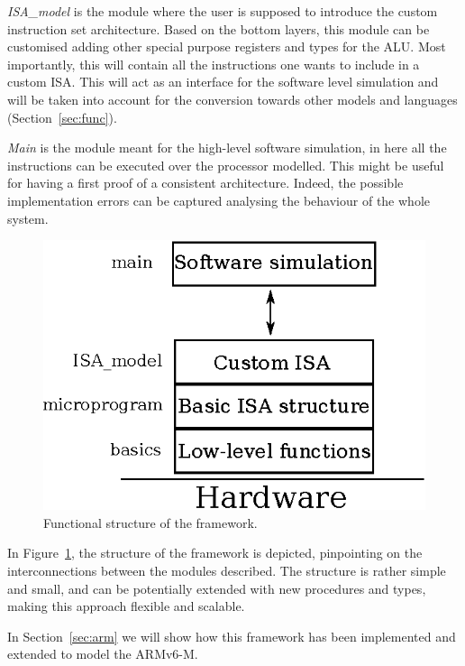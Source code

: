 \documentclass[conference]{IEEEtran}
\begin{document}
\textit{ISA\_model} is the module where the user is supposed to introduce the custom 
instruction set architecture. Based on the bottom layers, this
module can be customised adding other special purpose registers and types for the ALU.
Most importantly, this will contain all the instructions one wants to include in a custom ISA.
This will act as an interface for the software level simulation and will be taken into
account for the conversion towards other models and languages (Section~\ref{sec:func}).

\textit{Main} is the module meant for the high-level software simulation, in here
all the instructions can be executed over the processor modelled. This might be useful
for having a first proof of a consistent architecture. Indeed, the possible implementation
errors can be captured analysing the behaviour of the whole system.

\begin{figure}[ht!]
\begin{center}
	\includegraphics[scale=1]{IMG/structure.eps}
	\caption{Functional structure of the framework.}
	\label{fig:structure}
\end{center}
\end{figure}

In Figure~\ref{fig:structure}, the structure of the framework is depicted, pinpointing 
on the interconnections between the modules described. The structure is rather simple
and small, and can be potentially extended with new procedures and types, making
this approach flexible and scalable.

In Section~\ref{sec:arm} we will show how this framework has been implemented and extended
to model the ARMv6-M.
\end{document}
